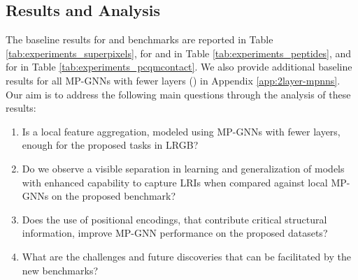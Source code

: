 \documentclass{article}
\begin{document}
\subsection{Results and Analysis}
The baseline results for \pascal and \coco benchmarks are reported in Table \ref{tab:experiments_superpixels}, for \pepfunc and \pepstruct in Table \ref{tab:experiments_peptides}, and for \pcqmcontact in Table \ref{tab:experiments_pcqmcontact}. We also provide additional baseline results for all MP-GNNs with fewer layers () in Appendix \ref{app:2layer-mpnns}. Our aim is to address the following main questions through the analysis of these results:
\vspace{-3pt}
\begin{enumerate}[label=(\roman*), leftmargin=2.5em]
\item Is a local feature aggregation, modeled using MP-GNNs with fewer layers, enough for the proposed tasks in LRGB?
\item Do we observe a visible separation in learning and generalization of models with enhanced capability to capture LRIs when compared against local MP-GNNs on the proposed benchmark?
\item Does the use of positional encodings, that contribute critical structural information,
improve MP-GNN performance on the proposed datasets?
\item What are the challenges and future discoveries that can be facilitated by the new benchmarks? 
\end{enumerate}

\vspace{8pt}
\end{document}
